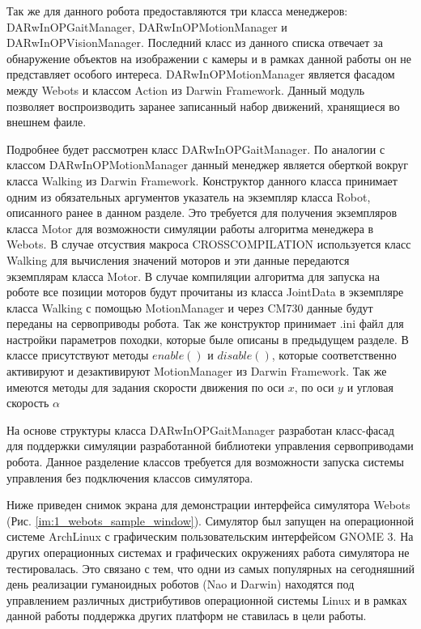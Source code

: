 Так же для данного робота предоставляются три класса менеджеров: DARwInOPGaitManager, DARwInOPMotionManager и DARwInOPVisionManager. Последний класс из данного списка отвечает за обнаружение объектов на изображении с камеры и в рамках данной работы он не представляет особого интереса. DARwInOPMotionManager является фасадом между Webots и классом Action из Darwin Framework. Данный модуль позволяет воспроизводить заранее записанный набор движений, хранящиеся во внешнем фаиле.

Подробнее будет рассмотрен класс DARwInOPGaitManager. По аналогии с классом DARwInOPMotionManager данный менеджер является оберткой вокруг класса Walking из Darwin Framework. Конструктор данного класса принимает одним из обязательных аргументов указатель на экземпляр класса Robot, описанного ранее в данном разделе. Это требуется для получения экземпляров класса Motor для возможности симуляции работы алгоритма менеджера в Webots. В случае отсуствия макроса CROSSCOMPILATION используется класс Walking для вычисления значений моторов и эти данные передаются экземплярам класса Motor. В случае компиляции алгоритма для запуска на роботе все позиции моторов будут прочитаны из класса JointData в экземпляре класса Walking с помощью MotionManager и через CM730 данные будут переданы на сервоприводы робота. Так же конструктор принимает \*.ini файл для настройки параметров походки, которые быле описаны в предыдущем разделе. В классе присутствуют методы $enable()$ и $disable()$, которые соответственно активируют и дезактивируют MotionManager из Darwin Framework. Так же имеются методы для задания скорости движения по оси $x$, по оси $y$ и угловая скорость $\alpha$

На основе структуры класса DARwInOPGaitManager разработан класс-фасад для поддержки симуляции разработанной библиотеки управления сервоприводами робота. Данное разделение классов требуется для возможности запуска системы управления без подключения классов симулятора.

Ниже приведен снимок экрана для демонстрации интерфейса симулятора Webots (Рис. \ref{im:1_webots_sample_window}). Симулятор был запущен на операционной системе ArchLinux с графическим пользовательским интерфейсом GNOME 3. На других операционных системах и графических окружениях работа симулятора не тестировалась. Это связано с тем, что одни из самых популярных на сегодняшний день реализации гуманоидных роботов (Nao и Darwin) находятся под управлением различных дистрибутивов операционной системы Linux и в рамках данной работы поддержка других платформ не ставилась в цели работы.

